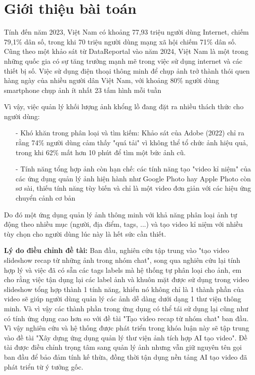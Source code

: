 \section{Giới thiệu bài toán}

Tính đến năm 2023, Việt Nam có khoảng 77,93 triệu người dùng Internet, chiếm 79,1\% dân số, trong khi 70 triệu người dùng mạng xã hội chiếm 71\% dân số\cite{vnetwork2023}. Cũng theo một khảo sát từ DataReportal vào năm 2024, Việt Nam là một trong những quốc gia có sự tăng trưởng mạnh mẽ trong việc sử dụng internet và các thiết bị số\cite{datareportal}. Việc sử dụng điện thoại thông minh để chụp ảnh trở thành thói quen hàng ngày của nhiều người dân Việt Nam, với khoảng 80\% người dùng smartphone chụp ảnh ít nhất 23 tấm hình mỗi tuần \cite{qandme}

Vì vậy, việc quản lý khối lượng ảnh khổng lồ đang đặt ra nhiều thách thức cho người dùng:
\begin{itemize}
	\item[-] Khó khăn trong phân loại và tìm kiếm: Khảo sát của Adobe (2022)\cite{catchlight} chỉ ra rằng 74\% người dùng cảm thấy "quá tải" vì không thể tổ chức ảnh hiệu quả, trong khi 62\% mất hơn 10 phút để tìm một bức ảnh cũ.
	\item[-] Tính năng tổng hợp ảnh còn hạn chế: các tính năng tạo "video kỉ niệm" của các ứng dụng quản lý ảnh hiện hành như Google Photo hay Apple Photo còn sơ sài, thiếu tính năng tùy biến và chỉ là một video đơn giản với các hiệu ứng chuyển cảnh cơ bản\cite{usmobile}
\end{itemize}

Do đó một ứng dụng quản lý ảnh thông minh với khả năng phân loại ảnh tự động theo nhiều mục (người, địa điểm, tags, ...) và tạo video kỉ niệm với nhiều tùy chọn cho người dùng lúc này là hết sức cần thiết.

\textbf{Lý do điều chỉnh đề tài:} Ban đầu, nghiên cứu tập trung vào "tạo video slideshow recap từ những ảnh trong nhóm chat", song qua nghiên cứu lại tính hợp lý và việc đã có sẵn các tags labels mà hệ thống tự phân loại cho ảnh, em cho rằng việc tận dụng lại các label ảnh và khuôn mặt được sử dụng trong video slideshow tổng hợp thành 1 tính năng, khiến nó không chỉ là 1 thành phần của video sẽ giúp người dùng quản lý các ảnh dễ dàng dưới dạng 1 thư viện thông minh. Và vì vậy các thành phần trong ứng dụng có thể tái sử dụng lại cũng như có tính ứng dụng cao hơn so với đề tài "Tạo video recap từ nhóm chat" ban đầu. Vì vậy nghiên cứu và hệ thống được phát triển trong khóa luận này sẽ tập trung vào đề tài "Xây dựng ứng dụng quản lý thư viện ảnh tích hợp AI tạo video".  Đề tài được điều chỉnh trọng tâm sang quản lý ảnh nhưng vẫn giữ nguyên tên gọi ban đầu để bảo đảm tính kế thừa, đồng thời tận dụng nền tảng AI tạo video đã phát triển từ ý tưởng gốc. 

